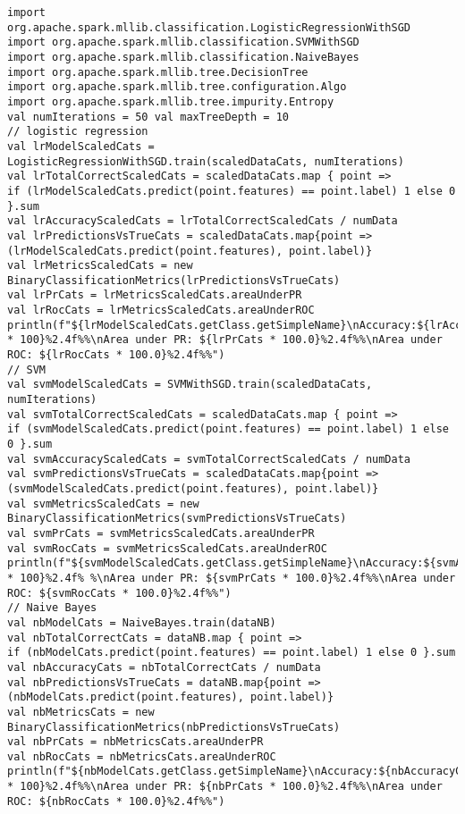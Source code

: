 \begin{lstlisting}
import
org.apache.spark.mllib.classification.LogisticRegressionWithSGD
import org.apache.spark.mllib.classification.SVMWithSGD
import org.apache.spark.mllib.classification.NaiveBayes
import org.apache.spark.mllib.tree.DecisionTree
import org.apache.spark.mllib.tree.configuration.Algo
import org.apache.spark.mllib.tree.impurity.Entropy
val numIterations = 50 val maxTreeDepth = 10
// logistic regression
val lrModelScaledCats = LogisticRegressionWithSGD.train(scaledDataCats, numIterations) 
val lrTotalCorrectScaledCats = scaledDataCats.map { point =>
if (lrModelScaledCats.predict(point.features) == point.label) 1 else 0 }.sum 
val lrAccuracyScaledCats = lrTotalCorrectScaledCats / numData
val lrPredictionsVsTrueCats = scaledDataCats.map{point =>
(lrModelScaledCats.predict(point.features), point.label)}
val lrMetricsScaledCats = new BinaryClassificationMetrics(lrPredictionsVsTrueCats)
val lrPrCats = lrMetricsScaledCats.areaUnderPR
val lrRocCats = lrMetricsScaledCats.areaUnderROC
println(f"${lrModelScaledCats.getClass.getSimpleName}\nAccuracy:${lrAccuracyScaledCats * 100}%2.4f%%\nArea under PR: ${lrPrCats * 100.0}%2.4f%%\nArea under ROC: ${lrRocCats * 100.0}%2.4f%%")
// SVM
val svmModelScaledCats = SVMWithSGD.train(scaledDataCats, numIterations) 
val svmTotalCorrectScaledCats = scaledDataCats.map { point =>
if (svmModelScaledCats.predict(point.features) == point.label) 1 else 0 }.sum 
val svmAccuracyScaledCats = svmTotalCorrectScaledCats / numData
val svmPredictionsVsTrueCats = scaledDataCats.map{point =>
(svmModelScaledCats.predict(point.features), point.label)}
val svmMetricsScaledCats = new BinaryClassificationMetrics(svmPredictionsVsTrueCats) 
val svmPrCats = svmMetricsScaledCats.areaUnderPR
val svmRocCats = svmMetricsScaledCats.areaUnderROC
println(f"${svmModelScaledCats.getClass.getSimpleName}\nAccuracy:${svmAccuracyScaledCats * 100}%2.4f% %\nArea under PR: ${svmPrCats * 100.0}%2.4f%%\nArea under ROC: ${svmRocCats * 100.0}%2.4f%%")
// Naive Bayes
val nbModelCats = NaiveBayes.train(dataNB) 
val nbTotalCorrectCats = dataNB.map { point =>
if (nbModelCats.predict(point.features) == point.label) 1 else 0 }.sum 
val nbAccuracyCats = nbTotalCorrectCats / numData
val nbPredictionsVsTrueCats = dataNB.map{point =>
(nbModelCats.predict(point.features), point.label)}
val nbMetricsCats = new BinaryClassificationMetrics(nbPredictionsVsTrueCats)
val nbPrCats = nbMetricsCats.areaUnderPR
val nbRocCats = nbMetricsCats.areaUnderROC
println(f"${nbModelCats.getClass.getSimpleName}\nAccuracy:${nbAccuracyCats * 100}%2.4f%%\nArea under PR: ${nbPrCats * 100.0}%2.4f%%\nArea under ROC: ${nbRocCats * 100.0}%2.4f%%")

\end{lstlisting}
